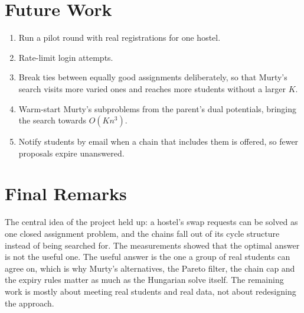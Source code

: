 \section{Future Work}

\begin{enumerate}
  \item Run a pilot round with real registrations for one hostel.
  \item Rate-limit login attempts.
  \item Break ties between equally good assignments deliberately, so
  that Murty's search visits more varied ones and reaches more students
  without a larger $K$.
  \item Warm-start Murty's subproblems from the parent's dual
  potentials, bringing the search towards $O(Kn^3)$.
  \item Notify students by email when a chain that includes them is
  offered, so fewer proposals expire unanswered.
\end{enumerate}

\section{Final Remarks}

The central idea of the project held up: a hostel's swap requests can
be solved as one closed assignment problem, and the chains fall out of
its cycle structure instead of being searched for. The measurements
showed that the optimal answer is not the useful one. The useful answer
is the one a group of real students can agree on, which is why Murty's
alternatives, the Pareto filter, the chain cap and the expiry rules
matter as much as the Hungarian solve itself. The remaining work is
mostly about meeting real students and real data, not about redesigning
the approach.

